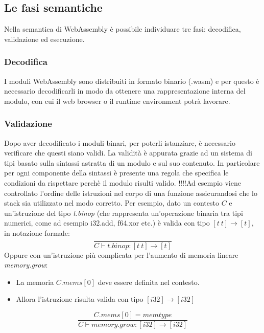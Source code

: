 \newpage
\subsection{Le fasi semantiche}
Nella semantica di WebAssembly è possibile individuare tre fasi: decodifica, validazione ed esecuzione.
\subsubsection{Decodifica}
I moduli WebAssembly sono distribuiti in formato binario (.wasm) e per questo è necessario decodificarli in modo da ottenere una rappresentazione interna del modulo, con cui il web browser o il runtime environment potrà lavorare.
\subsubsection{Validazione}
Dopo aver decodificato i moduli binari, per poterli istanziare, è necessario verificare che questi siano validi.
La validità è appurata grazie ad un sistema di tipi basato sulla sintassi astratta di un modulo e sul suo contenuto. In particolare per ogni componente della sintassi è presente una regola che specifica le condizioni da rispettare perchè il modulo risulti valido.
!!!!Ad esempio viene controllato l'ordine delle istruzioni nel corpo di una funzione assicurandosi che lo stack sia utilizzato nel modo corretto.
Per esempio, dato un contesto \(C\) e un'istruzione del tipo \emph{t.binop} (che rappresenta un'operazione binaria tra tipi numerici, come ad esempio i32.add, f64.xor etc.) è valida con tipo \([t~t]{\rightarrow} [t]\), in notazione formale: 
\begin{equation*}
\frac{
}{
        C {\vdash} t\mathsf{.}{\mathit{binop}} : [t~t] {\rightarrow} [t]
}
\end{equation*}
Oppure con un'istruzione più complicata per l'aumento di memoria lineare \emph{memory.grow}:
\begin{itemize}
        \item La memoria \(C.{\mathit{mems}}[0]\) deve essere definita nel contesto.
        \item Allora l'istruzione risulta valida con tipo \([{\mathit{i32}}] {\rightarrow} [{\mathit{i32}}]\)
\end{itemize}
\begin{equation*}
        \frac{
        C.{\mathit{mems}}[0] = {\mathit{memtype}}
      }{
        C {\vdash} {\mathit{memory.grow}} : [{\mathit{i32}}] {\rightarrow} [{\mathit{i32}}]
      }        
\end{equation*}
